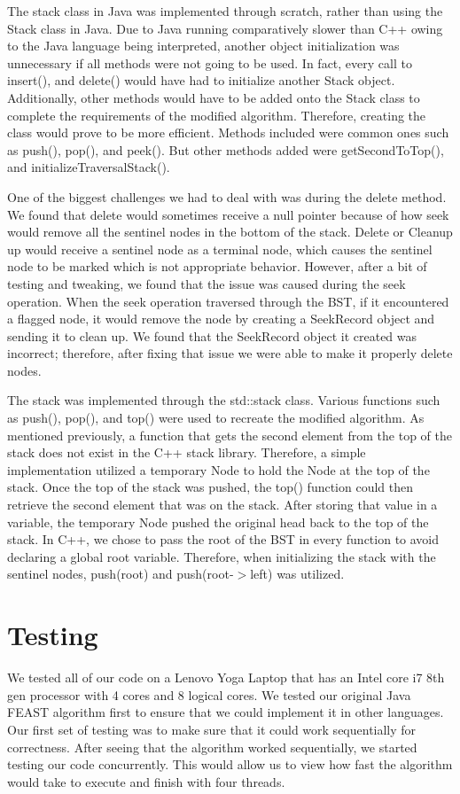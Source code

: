 \documentclass[conference]{IEEEtran}
\begin{document}
The stack class in Java was implemented through scratch, rather than using the Stack class in Java. Due to Java running comparatively slower than C++ owing to the Java language being interpreted, another object initialization was unnecessary if all methods were not going to be used. In fact, every call to insert(), and delete() would have had to initialize another Stack object. Additionally, other methods would have to be added onto the Stack class to complete the requirements of the modified algorithm. Therefore, creating the class would prove to be more efficient. Methods included were common ones such as push(), pop(), and peek(). But other methods added were getSecondToTop(), and initializeTraversalStack().

One of the biggest challenges we had to deal with was during the delete method. We found that delete would sometimes receive a null pointer because of how seek would remove all the sentinel nodes in the bottom of the stack. Delete or Cleanup up would receive a sentinel node as a terminal node, which causes the sentinel node to be marked which is not appropriate behavior. However, after a bit of testing and tweaking, we found that the issue was caused during the seek operation. When the seek operation traversed through the BST, if it encountered a flagged node, it would remove the node by creating a SeekRecord object and sending it to clean up. We found that the SeekRecord object it created was incorrect; therefore, after fixing that issue we were able to make it properly delete nodes.


The stack was implemented through the std::stack class. Various functions such as push(), pop(), and top() were used to recreate the modified algorithm. As mentioned previously, a function that gets the second element from the top of the stack does not exist in the C++ stack library. Therefore, a simple implementation utilized a temporary Node to hold the Node at the top of the stack. Once the top of the stack was pushed, the top() function could then retrieve the second element that was on the stack. After storing that value in a variable, the temporary Node pushed the original head back to the top of the stack. In C++, we chose to pass the root of the BST in every function to avoid declaring a global root variable. Therefore, when initializing the stack with the sentinel nodes, push(root) and push(root-$>$left) was utilized.

\section{Testing}
We tested all of our code on a Lenovo Yoga Laptop that has an Intel core i7 8th gen processor with 4 cores and 8 logical cores. We tested our original Java FEAST algorithm first to ensure that we could implement it in other languages. Our first set of testing was to make sure that it could work sequentially for correctness. After seeing that the algorithm worked sequentially, we started testing our code concurrently. This would allow us to view how fast the algorithm would take to execute and finish with four threads. 
\end{document}
